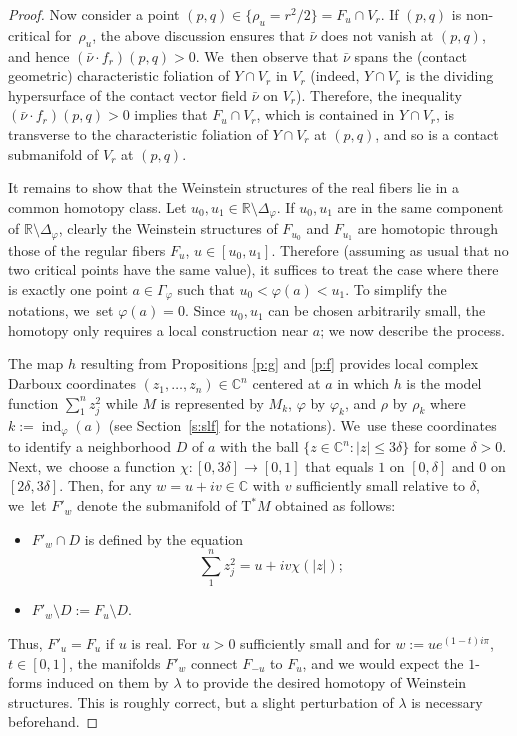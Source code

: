 \documentclass[JEP,XML,SOM,Unicode]{cedram}
\newcommand{\C}{{\mathbb C}}
\newcommand{\R}{{\mathbb R}}
\newcommand{\Crit}{\Gamma_{\!\varphi}}
\newcommand{\Discr}{\Delta_\varphi}
\newcommand{\ind}{\operatorname{ind}}
\newcommand{\etc}{,\ldots,}
\newcommand{\sT}{\mathrm{T}^\ast}
\newcommand{\cnu}{\bar\nu}
\newcommand{\de}{\mathrel{:=}}
\newcommand{\with}{\mathrel{:}}
\let\on\colon
\theoremstyle{plain}
\theoremstyle{definition}
\begin{document}
\begin{proof}
Now consider a point $(p,q) \!\in\! \{\rho_u \!=\! r^2/2\} = F_u \cap V_r$. If $(p,q)$
is non-critical for~$\rho_u$, the above discussion ensures that $\cnu$ does not
vanish at $(p,q)$, and hence \hbox{$(\cnu \cdot f_r) (p,q) > 0$}. We~then observe that
$\cnu$ spans the (contact geometric) characteristic foliation of $Y \cap V_r$ in
$V_r$ (indeed, $Y \cap V_r$ is the dividing hypersurface of the contact vector
field $\cnu$ on $V_r$). Therefore, the inequality $(\cnu \cdot f_r) (p,q) > 0$
implies that $F_u \cap V_r$, which is contained in $Y \cap V_r$, is transverse
to the characteristic foliation of $Y \cap V_r$ at $(p,q)$, and so is a contact
submanifold of $V_r$ at $(p,q)$.

It remains to show that the Weinstein structures of the real fibers lie in a
common homotopy class. Let $u_0, u_1 \in \R \setminus \Discr$. If $u_0, u_1$ are in the
same component of $\R \setminus \Discr$, clearly the Weinstein structures of $F_{u_0}$
and $F_{u_1}$ are homotopic through those of the regular fibers $F_u$, $u \in
[u_0,u_1]$. Therefore (assuming as usual that no two critical points have the
same value), it suffices to treat the case where there is exactly one point $a
\in \Crit$ such that $u_0 < \varphi(a) < u_1$. To simplify the notations, we~set
$\varphi(a) = 0$. Since $u_0, u_1$ can be chosen arbitrarily small, the homotopy
only requires a local construction near $a$; we now describe the process.

The map $h$ resulting from Propositions \ref{p:g} and \ref{p:f} provides local
complex Darboux coordinates $(z_1 \etc z_n) \in \C^n$ centered at $a$ in which
$h$ is the model function $\sum_1^n z_j^2$ while $M$ is represented by $M_k$,
$\varphi$ by $\varphi_k$, and $\rho$ by $\rho_k$ where $k \de \ind_\varphi(a)$
(see Section~\ref{s:slf} for the notations). We~use these coordinates to
identify a neighborhood $D$ of $a$ with the ball $\{z \in \C^n \with |z| \le 3
\delta\}$ for some $\delta>0$. Next, we~choose a function $\chi \on [0,3\delta]
\to [0,1]$ that equals $1$ on $[0,\delta]$ and $0$ on $[2\delta,3\delta]$. Then,
for any $w = u+iv \in \C$ with $v$ sufficiently small relative to $\delta$, we~let $F'_w$ denote the submanifold of $\sT M$ obtained as follows:
\begin{itemize}
\item
$F'_w \cap D$ is defined by the equation
\[
\sum_1^n z_j^2 = u + i v \chi(|z|);
\]
\item
$F'_w\setminus D \de F_u\setminus D$.
\end{itemize}
Thus, $F'_u = F_u$ if $u$ is real. For $u>0$ sufficiently small and for $w \de
u e^{(1-t)i\pi}$, $t \in [0,1]$, the manifolds $F'_w$ connect $F_{-u}$ to $F_u$,
and we would expect the $1$-forms induced on them by $\lambda$ to provide the
desired homotopy of Weinstein structures. This is roughly correct, but a slight
perturbation of $\lambda$ is necessary beforehand.


\end{proof}
\end{document}
